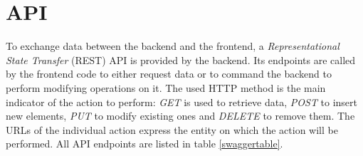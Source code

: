 \newpage

\section{API}
To exchange data between the backend and the frontend, a \textit{Representational State Transfer} (REST) API is provided by the backend. Its endpoints are called by the frontend code to either request data or to command the backend to perform modifying operations on it.
The used HTTP method is the main indicator of the action to perform: \textit{GET} is used to retrieve data, \textit{POST} to insert new elements, \textit{PUT} to modify existing ones and \textit{DELETE} to remove them. The URLs of the individual action express the entity on which the action will be performed. All API endpoints are listed in table \ref{swaggertable}.

